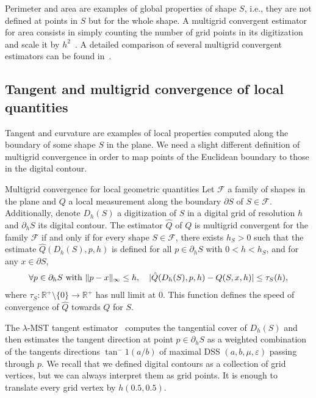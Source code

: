 Perimeter and area are examples of global properties of shape $S$, i.e., they are not defined at points in $S$ but for the whole shape. A multigrid convergent estimator for area consists in simply counting the number of grid points in its digitization and scale it by $h^2$~\cite{klette00multigrid}. A detailed comparison of several multigrid convergent estimators can be found in~\cite{coeurjolly12multigrid}.


\subsection{Tangent and multigrid convergence of local quantities}

Tangent and curvature are examples of local properties computed along the boundary of some shape $S$ in the plane. We need a slight different definition of multigrid convergence in order to map points of the Euclidean boundary to those in the digital contour.

\begin{definition}{Multigrid convergence for local geometric quantities}
Let $\mathcal{F}$ a family of shapes in the plane and $Q$ a local measurement along the boundary $\partial S$ of $S \in \mathcal{F}$. Additionally, denote $D_h(S)$ a digitization of $S$ in a digital grid of resolution $h$ and $\partial_h S$ its digital contour. The estimator $\hat{Q}$ of $Q$ is multigrid convergent for the family $\mathcal{F}$ if and only if for every shape $S \in \mathcal{F}$, there exists $h_S > 0$ such that the estimate $\hat{Q}(D_h(S),p,h)$ is defined for all $p \in \partial_h S$ with $0 < h < h_S$, and for any $x \in \partial S$,
\begin{align*}
	\forall p \in \partial_h S \text{ with } \lVert p-x\rVert_{\infty} \leq h,\quad | \hat{Q}(D_h(S),p,h) - Q(S,x,h) | \leq \tau_S(h),	
\end{align*}
where $\tau_S:\mathbb{R}^+\setminus \{0\} \rightarrow \mathbb{R}^+$ has null limit at $0$. This function defines the speed of convergence of $\hat{Q}$ towards $Q$ for $S$.
\end{definition}


The $\lambda$-MST tangent estimator~\cite{lachaud07tangent} computes the tangential cover of $D_h(S)$ and then estimates the tangent direction at point $p \in \partial_h S$ as a weighted combination of the tangents directions $\tan^-1(a/b)$  of maximal DSS $(a,b,\mu,\varepsilon)$ passing through $p$. We recall that we defined digital contours as a collection of grid vertices, but we can always interpret them as grid points. It is enough to translate every grid vertex by $h(0.5,0.5)$.

